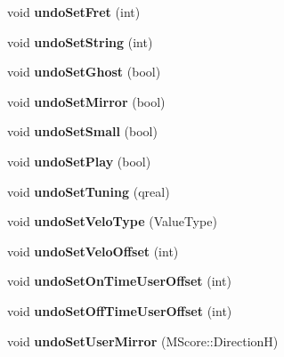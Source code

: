 \begin{DoxyCompactItemize}
void {\bfseries undo\+Set\+Fret} (int)
\item 
\mbox{\label{class_ms_1_1_note_abc18461a116bfb8d73e110356379eaf0}} 
void {\bfseries undo\+Set\+String} (int)
\item 
\mbox{\label{class_ms_1_1_note_a0986ae1c6c480c393fb41d107561069e}} 
void {\bfseries undo\+Set\+Ghost} (bool)
\item 
\mbox{\label{class_ms_1_1_note_a747d68f465054f2ad8346246c26cb7cb}} 
void {\bfseries undo\+Set\+Mirror} (bool)
\item 
\mbox{\label{class_ms_1_1_note_a478bd1c7b3bb67e32e0793c5b3df72e3}} 
void {\bfseries undo\+Set\+Small} (bool)
\item 
\mbox{\label{class_ms_1_1_note_ab51741d51b8b3811235054dfa99c0a29}} 
void {\bfseries undo\+Set\+Play} (bool)
\item 
\mbox{\label{class_ms_1_1_note_a61b0ca9cb93a24301a4331f0aa0d576a}} 
void {\bfseries undo\+Set\+Tuning} (qreal)
\item 
\mbox{\label{class_ms_1_1_note_afdbdf2e54d98d2fe042ee546e76d3eed}} 
void {\bfseries undo\+Set\+Velo\+Type} (Value\+Type)
\item 
\mbox{\label{class_ms_1_1_note_ae1106e08d1a6dc369dbb3d0aa5d34f9b}} 
void {\bfseries undo\+Set\+Velo\+Offset} (int)
\item 
\mbox{\label{class_ms_1_1_note_a73e35a41b7447667a1d669d967db077c}} 
void {\bfseries undo\+Set\+On\+Time\+User\+Offset} (int)
\item 
\mbox{\label{class_ms_1_1_note_adede4097c9ba47242725b18d2a68acf7}} 
void {\bfseries undo\+Set\+Off\+Time\+User\+Offset} (int)
\item 
\mbox{\label{class_ms_1_1_note_a15d8114ea00174e7cbd9c65e8f4b571e}} 
void {\bfseries undo\+Set\+User\+Mirror} (M\+Score\+::\+DirectionH)
\item 
\mbox{\label{class_ms_1_1_note_a477623bfee13fe9b94751bfede4a0ada}} 

\end{DoxyCompactItemize}
